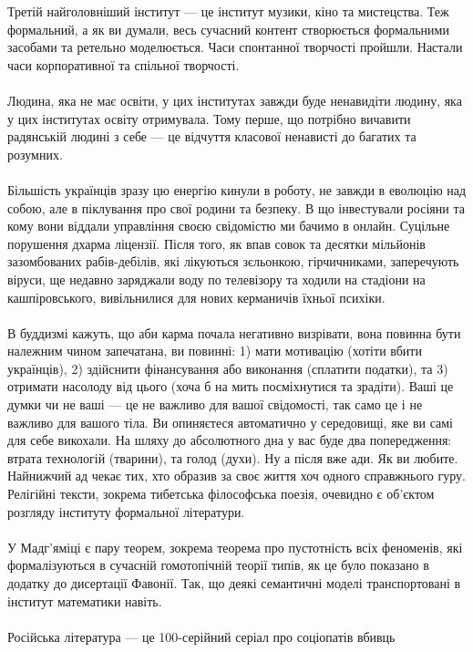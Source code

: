 Третій найголовніший інститут --- це інститут музики, кіно та мистецства. Теж формальний,
а як ви думали, весь сучасний контент створюється формальними засобами та ретельно
моделюється. Часи спонтанної творчості пройшли. Настали часи корпоративної та спільної творчості.
\\
\\
Людина, яка не має освіти, у цих інститутах завжди буде ненавидіти людину, яка у цих
інститутах освіту отримувала. Тому перше, що потрібно вичавити радянській людині з
себе --- це відчуття класової ненависті до багатих та розумних.
\\
\\
Більшість українців зразу цю енергію кинули в роботу, не завжди в еволюцію над собою,
але в піклування про свої родини та безпеку. В що інвестували росіяни та кому вони
віддали управління своєю свідомістю ми бачимо в онлайн. Суцільне порушення дхарма
ліцензії. Після того, як впав совок та десятки мільйонів зазомбованих рабів-дебілів,
які лікуються зєльонкою, гірчичниками, заперечують віруси, ще недавно заряджали воду
по телевізору та ходили на стадіони на кашпіровського, вивільнилися для нових керманичів їхньої психіки.
\\
\\
В буддизмі кажуть, що аби карма почала негативно визрівати, вона повинна бути
належним чином запечатана, ви повинні:
1) мати мотивацію (хотіти вбити українців),
2) здійснити фінансування або виконання (сплатити податки), та
3) отримати насолоду від цього (хоча б на мить посміхнутися та зрадіти).
Ваші це думки чи не ваші --- це не важливо для вашої свідомості, так само це
і не важливо для вашого тіла. Ви опиняєтеся автоматично у середовищі, яке
ви самі для себе викохали. На шляху до абсолютного дна у вас буде два
попередження: втрата технологій (тварини), та голод (духи). Ну а після вже ади.
Як ви любите. Найнижчий ад чекає тих, хто образив за своє життя хоч одного
справжнього гуру. Релігійні тексти, зокрема тибетська філософська поезія,
очевидно є об'єктом розгляду інституту формальної літератури.
\\
\\
У Мадг'яміці є пару теорем, зокрема теорема про пустотність всіх феноменів,
які формалізуються в сучасній гомотопічній теорії типів, як це було показано
в додатку до дисертації Фавонії. Так, що деякі семантичні моделі транспортовані
в інститут математики навіть.
\\
\\
Російська література --- це 100-серійний серіал про соціопатів вбивць
